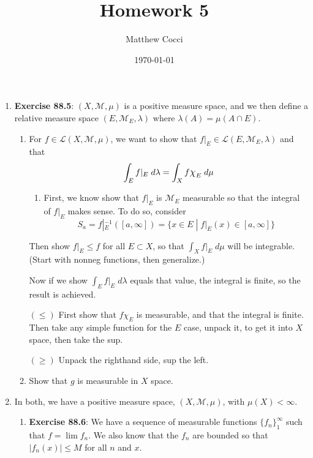 \documentclass[12pt]{article}
\author{Matthew Cocci}
\title{\textbf{Homework 5}}
\date{\today}
\theoremstyle{plain}
\theoremstyle{definition}
\theoremstyle{remark}
\newcommand*{\Chi}{\mbox{\large$\chi$}} %
\begin{document}
\maketitle 

\begin{enumerate} 

\item \textbf{Exercise 88.5}: $(X,\mathscr{M},\mu)$ is a positive measure space, and we then define a relative measure space $(E,\mathscr{M}_E,\lambda)$ where $\lambda(A)=\mu(A\cap E)$.

\begin{enumerate}
\item For $f\in\mathscr{L}(X,\mathscr{M},\mu)$, we want to show that $f|_E \in\mathscr{L}(E,\mathscr{M}_E,\lambda)$ and that
\[
    \int_E f|_E \; d\lambda = \int_X f \Chi_E\; d\mu
\]
\begin{enumerate}
    \item First, we know show that $f|_E$ is $\mathscr{M}_E$ measurable so that the integral of $f|_E$ makes sense. To do so, consider 
\[
    S_a = f|_E^{-1}([a,\infty]) = \{x \in E \; | \; f|_E(x)\in [a,\infty]\}
\]

\end{enumerate}

Then show $f|_E \leq f$ for all $E\subset X$, so that $\int_X f|_E \; d\mu$ will be integrable. (Start with nonneg functions, then generalize.) 

Now if we show $\int_E f|_E \; d\lambda$ equals that value, the integral is finite, so the result is achieved.

$(\leq)$ First show that $f\chi_E$ is measurable, and that the integral is finite. Then take any simple function for the $E$ case, unpack it, to get it into $X$ space, then take the sup.

$(\geq)$ Unpack the righthand side, sup the left.

\item Show that $g$ is measurable in $X$ space.  

\end{enumerate}

\item In both, we have a positive measure space, $(X,\mathscr{M},\mu)$, with $\mu(X)<\infty$.

\begin{enumerate} 

\item \textbf{Exercise 88.6}: We have a sequence of measurable functions $\{f_n\}_1^\infty$ such that $f=\lim f_n$. We also know that the $f_n$ are bounded so that $|f_n(x)|\leq M$ for all $n$ and $x$. 


\end{enumerate}
\end{enumerate}
\end{document}
